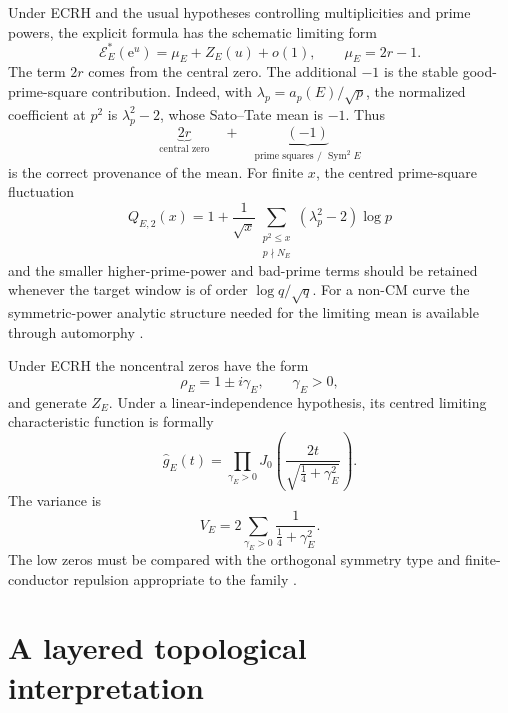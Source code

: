 \documentclass[11pt,reqno]{amsart}
\theoremstyle{remark}
\newcommand{\e}{\mathrm{e}}
\begin{document}
Under ECRH and the usual hypotheses controlling multiplicities and prime powers, the explicit formula has the schematic limiting form
\begin{equation}
  \mathcal E_E^{*}(\e^u)=\mu_E+Z_E(u)+o(1),
  \qquad \mu_E=2r-1.
  \label{eq:race-explicit}
\end{equation}
The term $2r$ comes from the central zero.  The additional $-1$ is the stable good-prime-square contribution.  Indeed, with $\lambda_p=a_p(E)/\sqrt p$, the normalized coefficient at $p^2$ is $\lambda_p^2-2$, whose Sato--Tate mean is $-1$.  Thus
\begin{equation}
  \underbrace{2r}_{\text{central zero}}
  \quad+\quad
  \underbrace{(-1)}_{\text{prime squares / }\operatorname{Sym}^2 E}
  \label{eq:mean-provenance}
\end{equation}
is the correct provenance of the mean.  For finite $x$, the centred prime-square fluctuation
\begin{equation}
  Q_{E,2}(x)
  =1+\frac1{\sqrt x}
   \sum_{\substack{p^2\le x\\p\nmid N_E}}
   (\lambda_p^2-2)\log p
  \label{eq:prime-square-fluctuation}
\end{equation}
and the smaller higher-prime-power and bad-prime terms should be retained whenever the target window is of order $\log q/\sqrt q$.  For a non-CM curve the symmetric-power analytic structure needed for the limiting mean is available through automorphy \cite{NewtonThorne2021II}.

Under ECRH the noncentral zeros have the form
\begin{equation}
  \rho_E=1\pm i\gamma_E,
  \qquad \gamma_E>0,
\end{equation}
and generate $Z_E$.  Under a linear-independence hypothesis, its centred limiting characteristic function is formally
\begin{equation}
  \widehat g_E(t)
  =\prod_{\gamma_E>0}
  J_0\!\left(\frac{2t}{\sqrt{\tfrac14+\gamma_E^2}}\right).
  \label{eq:bessel-product}
\end{equation}
The variance is
\begin{equation}
  V_E=2\sum_{\gamma_E>0}\frac{1}{\tfrac14+\gamma_E^2}.
  \label{eq:variance}
\end{equation}
The low zeros must be compared with the orthogonal symmetry type and finite-conductor repulsion appropriate to the family \cite{ILS2000,Miller2004,Miller2006,Marshall2013}.

\section{A layered topological interpretation}
\label{sec:topological-interpretation}
\end{document}
